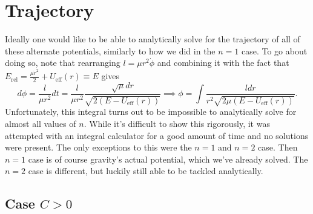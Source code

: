 \documentclass[letterpaper, reqno,11pt]{article}
\begin{document}
\section{Trajectory}

Ideally one would like to be able to analytically solve for the trajectory of all of these alternate potentials, similarly to how we did in the $n=1$ case. To go about doing so, note that rearranging $l=\mu r^2\dot\phi$ and combining it with the fact that $E_{\text{rel}}=\frac{\mu \dot r^2}{2} +U_{\text{eff}}(r)\equiv E$ gives 
\begin{equation}\label{eq:traj}
d\phi=\frac{l}{\mu r^2}dt=\frac{l}{\mu r^2}\frac{\sqrt{\mu}dr }{\sqrt{ 2(E-U_\text{eff}(r))}}\implies\phi=\int \frac{ldr}{r^2\sqrt{2\mu\left( E-U_{\text{eff}}(r) \right) } }
.\end{equation}
Unfortunately, this integral turns out to be impossible to analytically solve for almost all values of $n$. While it's difficult to show this rigorously, it was attempted with an integral calculator for a good amount of time and no solutions were present. The only exceptions to this were the $n=1$ and $n=2$ case. Then $n=1$ case is of course gravity's actual potential, which we've already solved. The $n=2$ case is different, but luckily still able to be tackled analytically. 

\subsection{Case $C>0$}
\end{document}
